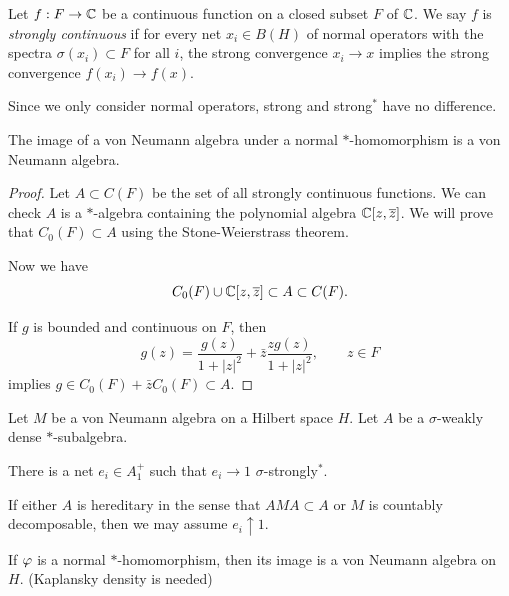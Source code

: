 \documentclass{../../large}
\begin{document}
\begin{prb}
Let $f:F\to\mathbb{C}$ be a continuous function on a closed subset $F$ of $\mathbb{C}$.
We say $f$ is \emph{strongly continuous} if for every net $x_i\in B(H)$ of normal operators with the spectra $\sigma(x_i)\subset F$ for all $i$, the strong convergence $x_i\to x$ implies the strong convergence $f(x_i)\to f(x)$.

\begin{parts}
\item Since we only consider normal operators, strong and strong$^*$ have no difference.
\item The image of a von Neumann algebra under a normal $*$-homomorphism is a von Neumann algebra.
\end{parts}

\end{prb}
\begin{proof}
Let $A\subset C(F)$ be the set of all strongly continuous functions.
We can check $A$ is a $*$-algebra containing the polynomial algebra $\mathbb{C}[z,\overline z]$.
We will prove that $C_0(F)\subset A$ using the Stone-Weierstrass theorem.

Now we have
\[C_0(F)\cup\mathbb{C}[z,\overline z]\subset A\subset C(F).\]

If $g$ is bounded and continuous on $F$, then
\[g(z)=\frac{g(z)}{1+|z|^2}+\bar z\frac{zg(z)}{1+|z|^2},\qquad z\in F\]
implies $g\in C_0(F)+\bar zC_0(F)\subset A$.

\end{proof}



\begin{prb}
Let $M$ be a von Neumann algebra on a Hilbert space $H$.
Let $A$ be a $\sigma$-weakly dense $*$-subalgebra.
\begin{parts}
\item There is a net $e_i\in A_1^+$ such that $e_i\to1$ $\sigma$-strongly$^*$.
\item If either $A$ is hereditary in the sense that $AMA\subset A$ or $M$ is countably decomposable, then we may assume $e_i\uparrow1$.
\end{parts}
\end{prb}



\begin{parts}
\item If $\varphi$ is a normal $*$-homomorphism, then its image is a von Neumann algebra on $H$. (Kaplansky density is needed)
\end{parts}
\end{document}
